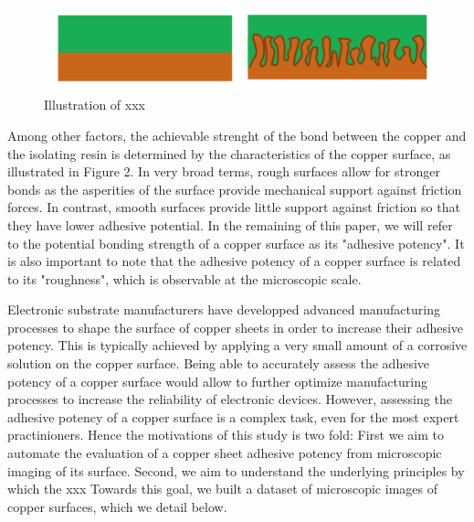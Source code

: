 \documentclass[10pt,twocolumn,letterpaper]{article}
\begin{document}
\begin{figure}[h]
	\centering
	\includegraphics[width=0.9\linewidth]{"./figures/Figure2"}
	\caption{
		Illustration of xxx
	}
\end{figure}

Among other factors, the achievable strenght of the bond between the copper and the isolating resin is determined by the characteristics of the copper surface, as illustrated in Figure 2. In very broad terms, rough surfaces allow for stronger bonds as the asperities of the surface provide mechanical support against friction forces. In contrast, smooth surfaces provide little support against friction so that they have lower adhesive potential. 
In the remaining of this paper, we will refer to the potential bonding strength of a copper surface as its "adhesive potency".
It is also important to note that the adhesive potency of a copper surface is related to its "roughness", which is observable at the microscopic scale.

Electronic substrate manufacturers have developped advanced manufacturing processes to shape the surface of copper sheets in order to increase their adhesive potency. This is typically achieved by applying a very small amount of a corrosive solution on the copper surface.
Being able to accurately assess the adhesive potency of a copper surface would allow to further optimize manufacturing processes to increase the reliability of electronic devices.
However, assessing the adhesive potency of a copper surface is a complex task, even for the most expert practinioners. 
Hence the motivations of this study is two fold: 
First we aim to automate the evaluation of a copper sheet adhesive potency from microscopic imaging of its surface. 
Second, we aim to understand the underlying principles by which the xxx 
Towards this goal, we built a dataset of microscopic images of copper surfaces, which we detail below.
\end{document}
